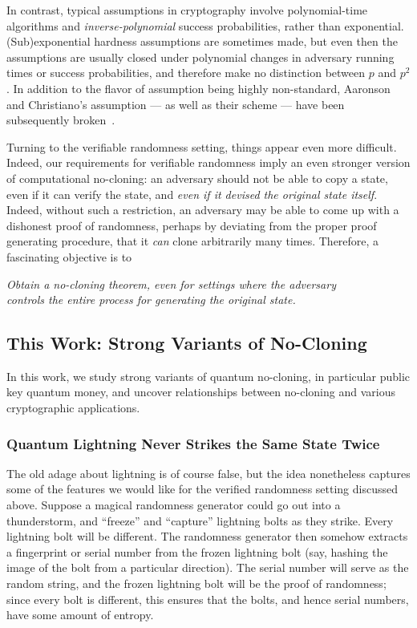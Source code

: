 In contrast, typical assumptions in cryptography involve polynomial-time algorithms and \emph{inverse-polynomial} success probabilities, rather than exponential.  (Sub)exponential hardness assumptions are sometimes made, but even then the assumptions are usually closed under polynomial changes in adversary running times or success probabilities, and therefore make no distinction between $p$ and $p^2$.  In addition to the flavor of assumption being highly non-standard, Aaronson and Christiano's assumption --- as well as their scheme --- have been subsequently broken~\cite{PKC:PenFauPer15,Aaronson16}. 

\medskip

Turning to the verifiable randomness setting, things appear even more difficult.  Indeed, our requirements for verifiable randomness imply an even stronger version of computational no-cloning: an adversary should not be able to copy a state, even if it can verify the state, and \emph{even if it devised the original state itself}.  Indeed, without such a restriction, an adversary may be able to come up with a dishonest proof of randomness, perhaps by deviating from the proper proof generating procedure, that it \emph{can} clone arbitrarily many times.  Therefore, a fascinating objective is to

\begin{center}{\it Obtain a no-cloning theorem, even for settings where the adversary\\ controls the entire process for generating the original state.}
\end{center}

\subsection{This Work: Strong Variants of No-Cloning}

In this work, we study strong variants of quantum no-cloning, in particular public key quantum money, and uncover relationships between no-cloning and various cryptographic applications.

\subsubsection{Quantum Lightning Never Strikes the Same State Twice}

The old adage about lightning is of course false, but the idea nonetheless captures some of the features we would like for the verified randomness setting discussed above.  Suppose a magical randomness generator could go out into a thunderstorm, and ``freeze'' and ``capture'' lightning bolts as they strike.  Every lightning bolt will be different.  The randomness generator then somehow extracts a fingerprint or serial number from the frozen lightning bolt (say, hashing the image of the bolt from a particular direction).  The serial number will serve as the random string, and the frozen lightning bolt will be the proof of randomness; since every bolt is different, this ensures that the bolts, and hence serial numbers, have some amount of entropy.


